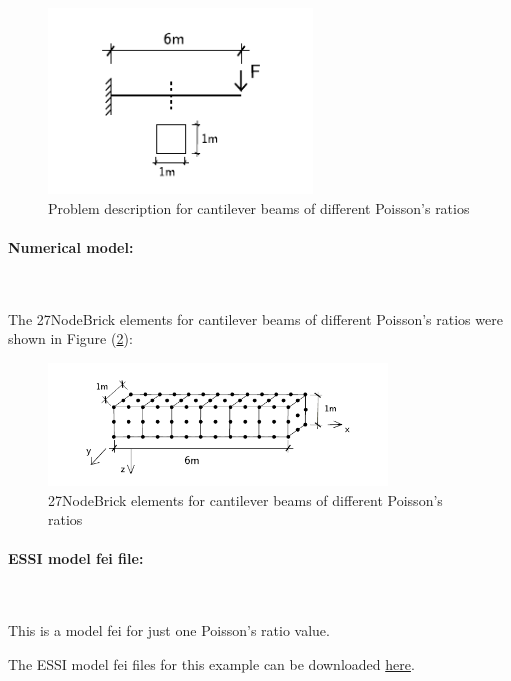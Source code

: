 \documentclass[fleqn,11pt]{article}
\begin{document}
\begin{figure}[H]
  \centering
  \includegraphics[width=7cm]{../Figure-files/cantilever_6.pdf}
  \caption{Problem description for cantilever beams of different Poisson's ratios}
  \label{fig Problem description for cantilever beams of different Poisson's 27}
\end{figure}

\paragraph{Numerical model:} ~

The 27NodeBrick elements for cantilever beams of different Poisson's ratios were shown in Figure (\ref{fig 27NodeBrick elements for cantilever beams of different Poisson's ratios}):
\begin{figure}[H]
  \centering
  \includegraphics[width=9cm]{../Figure-files/beam_27brick_6div.pdf}
  \caption{27NodeBrick elements for cantilever beams of different Poisson's ratios}
  \label{fig 27NodeBrick elements for cantilever beams of different Poisson's ratios}
\end{figure}

\paragraph{ESSI model fei file: } ~

This is a model fei for just one Poisson's ratio value.



The ESSI model fei files for this example can be downloaded \href{https://github.com/yuan-energy/Real-ESSI-Examples/blob/master/model_fei_file/27NodeBrick_cantilever_different_Poisson/27NodeBrick_cantilever_different_Poisson.tgz?raw=true}{here}.
\end{document}
